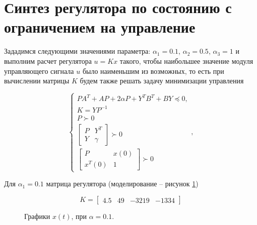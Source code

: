 \section{Синтез регулятора по состоянию с ограничением на управление}

Зададимся следующими значениями параметра: $\alpha_1= 0.1$, $\alpha_2 = 0.5$, $\alpha_3 = 1$ и выполним расчет регулятора $u=Kx$ такого, чтобы наибольшее значение модуля управляющего сигнала $u$ было наименьшим из возможных, то есть при вычислении матрицы $K$ будем также решать задачу минимизации управления

\begin{equation}
    \begin{cases}
      PA^T+AP+2 \alpha P + Y^T B^T+BY \preceq 0,\\
        K = Y P^{-1}\\
        P \succ 0\\
        \begin{bmatrix}
            P & Y^T\\
            Y & \gamma
        \end{bmatrix} \succ 0\\[2pt]
        \begin{bmatrix}
            P & x(0)\\
            x^T(0) & 1
        \end{bmatrix} \succ 0
    \end{cases},
\end{equation}

Для $\alpha_1=0.1$ матрица регулятора (моделирование -- рисунок \ref{4_3_1})

\begin{equation}
    K = \begin{bmatrix}
        4.5 & 49 & -3219 & -1334
    \end{bmatrix}
\end{equation}

\begin{figure}[!h]
\caption{Графики $x(t)$, при $\alpha = 0.1$.}
\label{4_3_1}
\end{figure}




